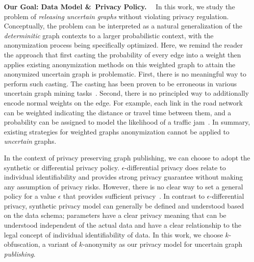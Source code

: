 \textbf{Our Goal: Data Model \&~Privacy Policy.}~~
In this work, we study the problem of \emph{releasing uncertain graphs} without violating privacy regulation. Conceptually, the problem can be interpreted as a natural generalization of the \emph{determinitic} graph contexts to a larger probabilistic context, with the anonymization process being specifically optimized. Here, we remind the reader the approach that first casting the probability of every edge into a weight then applies existing anonymization methods on this weighted graph to attain the anonymized uncertain graph is problematic. First, there is no meaningful way to perform such casting. The casting has been proven to be erroneous in various uncertain graph mining tasks~\cite{Potamias_K_2010,Zhao_Detecting_2014}. Second, there is no principled way to additionally encode normal weights on the edge. For example, each link in the road network can be weighted indicating the distance or travel time between them, and a probability can be assigned to model the likelihood of a traffic jam~\cite{Jin_Distance_2011}. In summary, existing strategies for weighted graphs anonymization cannot be applied to \emph{uncertain} graphs.

In the context of privacy preserving graph publishing, we can choose to adopt the synthetic or differential privacy policy.
$\epsilon$-differential privacy does relate to individual identifiability and provides strong privacy guarantee without making any assumption of privacy risks. However, there is no clear way to set a general policy for a value $\epsilon$ that provides sufficient privacy~\cite{lee2011}. In contrast to $\epsilon$-differential privacy, synthetic privacy model can generally be defined and understood based on the data schema; parameters have a clear privacy meaning that can be understood independent of the actual data and have a clear relationship to the legal concept of individual identifiability of data. In this work, we choose $k$-obfuscation, a variant of $k$-anonymity as our privacy model for uncertain graph \emph{publishing}.

